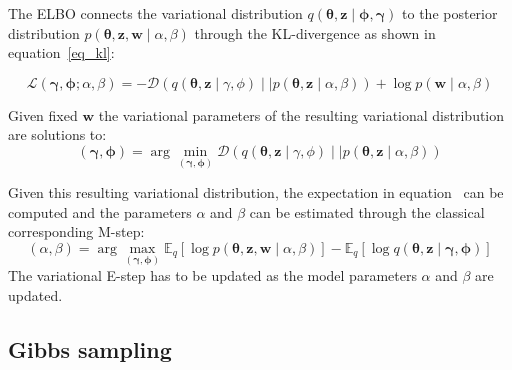 \documentclass[12pt,a4paper,onecolumn]{article}
\begin{document}
The ELBO connects the variational distribution \(q(\bm{\theta}, \bm{z} \mid \bm{\phi}, \bm{\gamma})\) to the posterior distribution \(p(\bm{\theta}, \bm{z}, \bm{w} \mid \alpha, \beta)\) through the KL-divergence as shown in equation~\eqref{eq_kl}:

\begin{equation}
	\mathcal{L}(\bm{\gamma}, \bm{\phi} ; \alpha, \beta) = -\mathcal{D}(q(\bm{\theta}, \bm{z} \mid \gamma, \phi)\mid\mid p(\bm{\theta}, \bm{z} \mid \alpha, \beta)) + \log p(\bm{w} \mid \alpha, \beta)
	\label{eq_kl}
\end{equation}

Given fixed \(\bm{w}\) the variational parameters of the resulting variational distribution are solutions to:
\begin{equation*}
	(\bm{\gamma}, \bm{\phi}) = \operatorname{arg}\min_{(\bm{\gamma}, \bm{\phi})} \mathcal{D}(q(\bm{\theta}, \bm{z} \mid \gamma, \phi)\mid\mid p(\bm{\theta}, \bm{z} \mid \alpha, \beta)) \tag{variational E-step}
\end{equation*}

Given this resulting variational distribution, the expectation in  equation~ can be computed and the parameters \(\alpha\) and \(\beta\) can be estimated through the classical corresponding M-step:
\begin{equation*}
	(\alpha, \beta) = \operatorname{arg}\max_{(\bm{\gamma}, \bm{\phi})} \mathbb{E}_{q}\left[\log p(\bm{\theta},\bm{z}, \bm{w} \mid \alpha, \beta)\right] - \mathbb{E}_{q}\left[\log q(\bm{\theta}, \bm{z} \mid \bm{\gamma}, \bm{\phi})\right] \tag{M-step}
\end{equation*}
The variational E-step has to be updated as the model parameters \(\alpha\) and \(\beta\) are updated.



\subsection{Gibbs sampling}


\newpage
%
\end{document}
